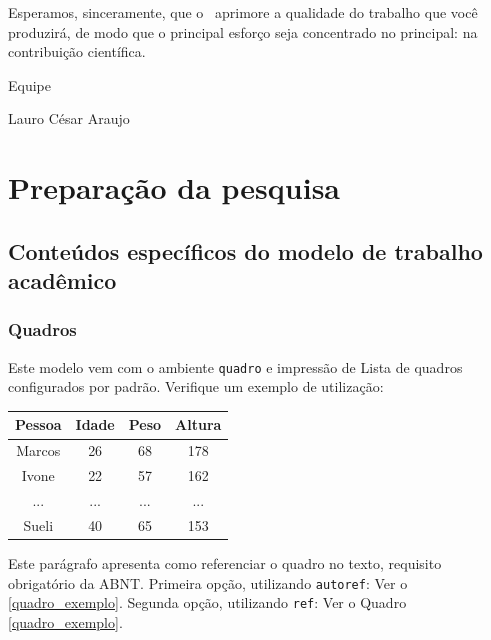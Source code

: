 \documentclass[
	12pt,				%
	openright,			%
	twoside,			%
	a4paper,			%
	english,			%
	french,				%
	spanish,			%
	brazil				%
	]{abntex2}
\begin{document}
Esperamos, sinceramente, que o \abnTeX\ aprimore a qualidade do trabalho que
você produzirá, de modo que o principal esforço seja concentrado no principal:
na contribuição científica.

Equipe \abnTeX 

Lauro César Araujo

\part{Preparação da pesquisa}



\chapter{Conteúdos específicos do modelo de trabalho acadêmico}\label{cap_trabalho_academico}

\section{Quadros}

Este modelo vem com o ambiente \texttt{quadro} e impressão de Lista de quadros 
configurados por padrão. Verifique um exemplo de utilização:

\begin{quadro}[htb]
\caption{\label{quadro_exemplo}Exemplo de quadro}
\begin{tabular}{|c|c|c|c|}
	\hline
	\textbf{Pessoa} & \textbf{Idade} & \textbf{Peso} & \textbf{Altura} \\ \hline
	Marcos & 26    & 68   & 178    \\ \hline
	Ivone  & 22    & 57   & 162    \\ \hline
	...    & ...   & ...  & ...    \\ \hline
	Sueli  & 40    & 65   & 153    \\ \hline
\end{tabular}
\end{quadro}

Este parágrafo apresenta como referenciar o quadro no texto, requisito
obrigatório da ABNT. 
Primeira opção, utilizando \texttt{autoref}: Ver o \autoref{quadro_exemplo}. 
Segunda opção, utilizando  \texttt{ref}: Ver o Quadro \ref{quadro_exemplo}.
\end{document}

